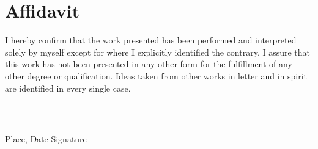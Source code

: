 \section*{Affidavit}
\vspace*{1.0cm}
I  hereby confirm that the  work  presented  has  been  performed  and interpreted solely by myself except for where I explicitly identified the contrary. I assure that this work has not been presented in any other form for the fulfillment of any other degree or qualification. Ideas taken from other works in letter and in spirit are identified in every single case.\\
\newline
\newline
\newline



\rule{5.5cm}{0.4pt} \phantom{ssssssssssssssssspace} \rule{5.5cm}{0.4pt}\\
\phantom{space}Place, Date \phantom{sssssssssssssssssssssssssssssssssssssspace} Signature
